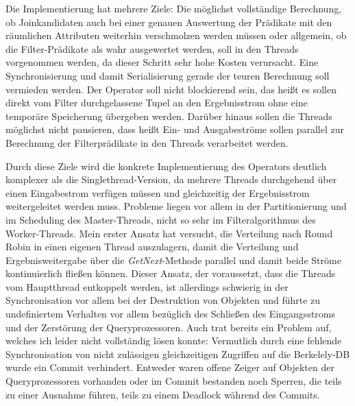 \documentclass[a4paper,12pt,twoside]{article}
\newcommand{\Fb}[1]{\textit{#1}} %
\begin{document}
Die Implementierung hat mehrere Ziele: Die möglichst vollständige Berechnung, ob Joinkandidaten auch bei einer genauen Auswertung der Prädikate mit den räumlichen Attributen weiterhin verschmolzen werden müssen oder allgemein, ob die Filter-Prädikate als wahr ausgewertet werden, soll in den Threads vorgenommen werden, da dieser Schritt sehr hohe Kosten verursacht. Eine Synchronisierung und damit Serialisierung gerade der teuren Berechnung soll vermieden werden. Der Operator soll nicht blockierend sein, das heißt es sollen direkt vom Filter durchgelassene Tupel an den Ergebnisstrom ohne eine temporäre Speicherung übergeben werden. Darüber hinaus sollen die Threads möglichst nicht pausieren, dass heißt Ein- und Ausgabeströme sollen parallel zur Berechnung der Filterprädikate in den Threads verarbeitet werden.

Durch diese Ziele wird die konkrete Implementierung des Operators deutlich komplexer als die Singlethread-Version, da mehrere Threads durchgehend über einen Eingabestrom verfügen müssen und gleichzeitig der Ergebnisstrom weitergeleitet werden muss. Probleme liegen vor allem in der Partitionierung und im Scheduling des Master-Threads, nicht so sehr im Filteralgorithmus des Worker-Threads. Mein erster Ansatz hat versucht, die Verteilung nach Round Robin in einen eigenen Thread auszulagern, damit die Verteilung und Ergebnisweitergabe über die \Fb{\Fb{GetNext}}-Methode parallel und damit beide Ströme kontinuierlich fließen können. Dieser Ansatz, der voraussetzt, dass die Threads vom Hauptthread entkoppelt werden, ist allerdings schwierig in der Synchronisation vor allem bei der Destruktion von Objekten und führte zu undefiniertem Verhalten vor allem bezüglich des Schließen des Eingangsstroms und der Zerstörung der Queryprozessoren. Auch trat bereits ein Problem auf, welches ich leider nicht vollständig lösen konnte: Vermutlich durch eine fehlende Synchronisation von nicht zulässigen gleichzeitigen Zugriffen auf die Berkelely-DB wurde ein Commit verhindert. Entweder waren offene Zeiger auf Objekten der Queryprozessoren vorhanden oder im Commit bestanden noch Sperren, die teils zu einer Ausnahme führen, teils zu einem Deadlock während des Commits.
\end{document}
